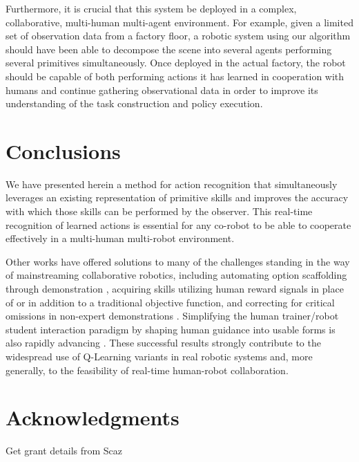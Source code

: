 \documentclass[letterpaper]{article}
\begin{document}
Furthermore, it is crucial that this system be deployed in a complex, collaborative, multi-human multi-agent environment.  For example, given a limited set of observation data from a factory floor, a robotic system using our algorithm should have been able to decompose the scene into several agents performing several primitives simultaneously.  Once deployed in the actual factory, the robot should be capable of both performing actions it has learned in cooperation with humans and continue gathering observational data in order to improve its understanding of the task construction and policy execution.


\section{Conclusions}
\label{sec:conclusions}
We have presented herein a method for action recognition that simultaneously leverages an existing representation of primitive skills and improves the accuracy with which those skills can be performed by the observer.  This real-time recognition of learned actions is essential for any co-robot to be able to cooperate effectively in a multi-human multi-robot environment.

Other works have offered solutions to many of the challenges standing in the way of mainstreaming collaborative robotics, including automating option scaffolding through demonstration \cite{AutoSkillAcquisition}, acquiring skills utilizing human reward signals in place of \cite{TAMER} or in addition to \cite{TeacherRL} a traditional objective function, and correcting for critical omissions in non-expert demonstrations \cite{PerspectiveTaking}. Simplifying the human trainer/robot student interaction paradigm by shaping human guidance into usable forms is also rapidly advancing \cite{TAMER,Clicker,AdviceTaking,TeacherRL,DemonstrationRL}. These successful results strongly contribute to the widespread use of Q-Learning variants in real robotic systems and, more generally, to the feasibility of real-time human-robot collaboration.

\section{Acknowledgments}
\label{sec:acknowledgments}
Get grant details from Scaz



\end{document}
